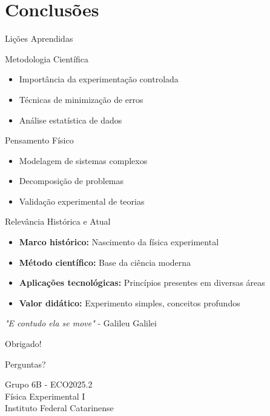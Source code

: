 \documentclass[12pt]{beamer}
\begin{document}
\section{Conclusões}

\begin{frame}{Lições Aprendidas}
    \begin{block}{Metodologia Científica}
        \begin{itemize}
            \item Importância da experimentação controlada
            \item Técnicas de minimização de erros
            \item Análise estatística de dados
        \end{itemize}
    \end{block}

    \begin{block}{Pensamento Físico}
        \begin{itemize}
            \item Modelagem de sistemas complexos
            \item Decomposição de problemas
            \item Validação experimental de teorias
        \end{itemize}
    \end{block}
\end{frame}

\begin{frame}{Relevância Histórica e Atual}
    \begin{itemize}
        \item \textbf{Marco histórico:} Nascimento da física experimental
        \item \textbf{Método científico:} Base da ciência moderna
        \item \textbf{Aplicações tecnológicas:} Princípios presentes em diversas áreas
        \item \textbf{Valor didático:} Experimento simples, conceitos profundos
    \end{itemize}

    \begin{center}
        \textit{"E contudo ela se move"} - Galileu Galilei
    \end{center}
\end{frame}

\begin{frame}
    \begin{center}
        \Huge Obrigado!

        \vspace{1cm}

        \Large Perguntas?

        \vspace{1cm}

        \normalsize
        Grupo 6B - ECO2025.2 \\
        Física Experimental I \\
        Instituto Federal Catarinense
    \end{center}
\end{frame}
\end{document}
